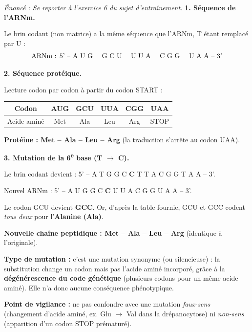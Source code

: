 \documentclass[11pt]{article}
\newcommand{\cle}[1]{{\popxbold\color{popdark}#1}}
\begin{document}
\begin{corrige}
\textit{Énoncé : Se reporter à l'exercice 6 du sujet d'entraînement.}
\tcblower
\textbf{1. Séquence de l'ARNm.}

Le brin codant (non matrice) a la même séquence que l'ARNm, T étant remplacé par U :
\[ \text{ARNm : 5' -- A U G \quad G C U \quad U U A \quad C G G \quad U A A -- 3'} \]

\textbf{2. Séquence protéique.}

Lecture codon par codon à partir du codon START :
\begin{center}
\begin{tabular}{|c|c|c|c|c|c|}\hline
Codon & AUG & GCU & UUA & CGG & UAA \\ \hline
Acide aminé & Met & Ala & Leu & Arg & STOP \\ \hline
\end{tabular}
\end{center}
\textbf{Protéine : Met -- Ala -- Leu -- Arg} (la traduction s'arrête au codon UAA).

\textbf{3. Mutation de la 6\textsuperscript{e} base (T $\to$ C).}

Le brin codant devient : 5' -- A T G \; G C \textbf{C} \; T T A \; C G G \; T A A -- 3'.

Nouvel ARNm : 5' -- A U G \; G C \textbf{C} \; U U A \; C G G \; U A A -- 3'.

Le codon GCU devient \textbf{GCC}. Or, d'après la table fournie, GCU et GCC codent \emph{tous deux} pour l'\textbf{Alanine (Ala)}.

\textbf{Nouvelle chaîne peptidique : Met -- Ala -- Leu -- Arg} (identique à l'originale).

\textbf{Type de mutation :} c'est une mutation \cle{synonyme} (ou silencieuse) : la substitution change un codon mais pas l'acide aminé incorporé, grâce à la \textbf{dégénérescence du code génétique} (plusieurs codons pour un même acide aminé). Elle n'a donc aucune conséquence phénotypique.

\textbf{Point de vigilance :} ne pas confondre avec une mutation \emph{faux-sens} (changement d'acide aminé, ex. Glu $\to$ Val dans la drépanocytose) ni \emph{non-sens} (apparition d'un codon STOP prématuré).
\end{corrige}
\end{document}
